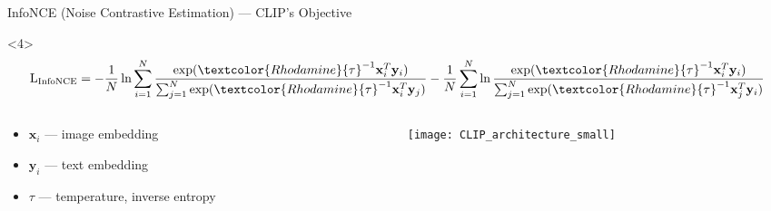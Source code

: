 \documentclass[utf8,aspectratio=169,ngerman,english,usenames,dvipsnames]{beamer}
\begin{document}
\begin{frame}{InfoNCE (Noise Contrastive Estimation) --- CLIP's Objective}
    \begin{onlyenv}<4>
        \begin{equation*}
            \operatorname{L_{InfoNCE}} =
            - \frac{1}{N} \ln \sum_{i=1}^{N} \frac{\exp(\textcolor{Rhodamine}{\tau}^{-1} \mathbf{x}_i^T \mathbf{y}_i)}{\sum_{j=1}^{N} \exp(\textcolor{Rhodamine}{\tau}^{-1} \mathbf{x}_i^T \mathbf{y}_j)}
            - \frac{1}{N} \sum_{i=1}^{N} \ln \frac{\exp(\textcolor{Rhodamine}{\tau}^{-1} \mathbf{x}_i^T \mathbf{y}_i)}{\sum_{j=1}^{N} \exp(\textcolor{Rhodamine}{\tau}^{-1} \mathbf{x}_j^T \mathbf{y}_i)}
        \end{equation*}
        \begin{columns}
            \begin{column}{0.5\textwidth}
                \begin{itemize}
                    \item $\mathbf{x}_i$ --- image embedding
                    \item $\mathbf{y}_i$ --- text embedding
                    \item \textcolor{Rhodamine}{$\tau$} --- temperature, inverse entropy
                \end{itemize}
            \end{column}
            \begin{column}{0.5\textwidth}
                \begin{figure}
                    \centering
                    \texttt{[image: CLIP\_architecture\_small]}
                \end{figure}
            \end{column}
        \end{columns}
    \end{onlyenv}


\end{frame}
\end{document}

